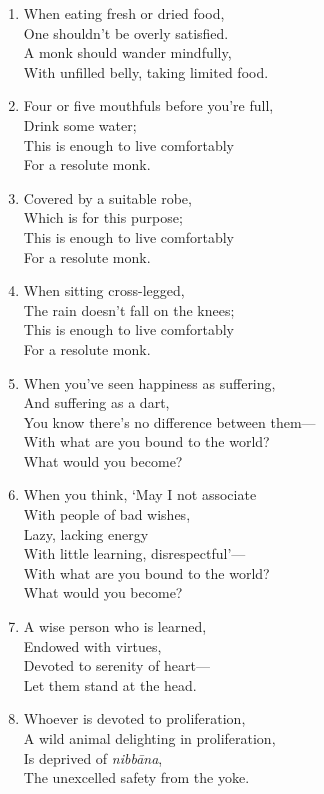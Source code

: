 \documentclass[10pt, openany]{book}
\begin{document}
\begin{enumerate}
\item When eating fresh or dried food,\\
One shouldn’t be overly satisfied.\\
A monk should wander mindfully,\\
With unfilled belly, taking limited food.

\item Four or five mouthfuls before you’re full,\\
Drink some water;\\
This is enough to live comfortably\\
For a resolute monk.

\item Covered by a suitable robe,\\
Which is for this purpose;\\
This is enough to live comfortably\\
For a resolute monk.

\item When sitting cross-legged,\\
The rain doesn’t fall on the knees;\\
This is enough to live comfortably\\
For a resolute monk.

\item When you’ve seen happiness as suffering,\\
And suffering as a dart,\\
You know there’s no difference between them—\\
With what are you bound to the world?\\
What would you become?

\item When you think, ‘May I not associate \\
With people of bad wishes,\\
Lazy, lacking energy\\
With little learning, disrespectful’—\\
With what are you bound to the world?\\
What would you become?

\item A wise person who is learned,\\
Endowed with virtues,\\
Devoted to serenity of heart—\\
Let them stand at the head.

\item Whoever is devoted to proliferation,\\
A wild animal delighting in proliferation,\\
Is deprived of \emph{nibbāna},\\
The unexcelled safety from the yoke.


\end{enumerate}
\end{document}
